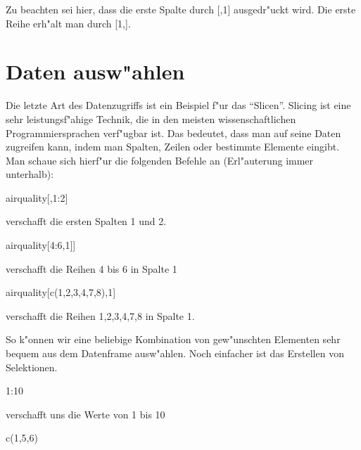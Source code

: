 \documentclass[a4paper,twoside]{tufte-book}\usepackage[]{graphicx}\usepackage[]{color}
\begin{document}
\begin{appendices}
Zu beachten sei hier, dass die erste Spalte durch [,1] ausgedr"uckt wird. Die erste Reihe erh"alt man durch [1,].

\section{Daten ausw"ahlen}

Die letzte Art des Datenzugriffs ist ein Beispiel f"ur das "`Slicen"'. Slicing ist eine sehr leistungsf"ahige Technik, die in den meisten wissenschaftlichen Programmiersprachen verf"ugbar ist. Das bedeutet, dass man auf seine Daten zugreifen kann, indem man Spalten, Zeilen oder bestimmte Elemente eingibt. Man schaue sich hierf"ur die folgenden Befehle an (Erl"auterung immer unterhalb):

\begin{Schunk}
\begin{Sinput}
airquality[,1:2]
\end{Sinput}
\end{Schunk}

verschafft die ersten Spalten 1 und 2.


\begin{Schunk}
\begin{Sinput}
airquality[4:6,1]]
\end{Sinput}
\end{Schunk}

verschafft die Reihen 4 bis 6 in Spalte 1


\begin{Schunk}
\begin{Sinput}
airquality[c(1,2,3,4,7,8),1]
\end{Sinput}
\end{Schunk}

verschafft die Reihen 1,2,3,4,7,8 in Spalte 1. 

So k"onnen wir eine beliebige Kombination von gew"unschten Elementen sehr bequem aus dem Datenframe ausw"ahlen. Noch einfacher ist das Erstellen von Selektionen.


\begin{Schunk}
\begin{Sinput}
1:10
\end{Sinput}
\end{Schunk}

verschafft uns die Werte von 1 bis 10

\begin{Schunk}
\begin{Sinput}
c(1,5,6)
\end{Sinput}
\end{Schunk}


\end{appendices}
\end{document}
